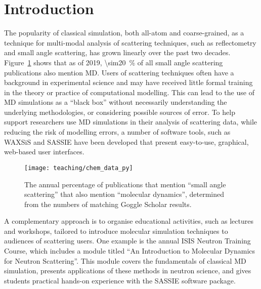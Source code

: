 \section{Introduction}
The popularity of classical simulation, both all-atom and coarse-grained, as a technique for multi-modal analysis of scattering techniques, such as reflectometry and small angle scattering, has grown linearly over the past two decades.\autocite{pan_molecular_2012,boldon_review_2015,hub_interpreting_2018,koutsioubas_combined_2016,darre_molecular_2015,scoppola_combining_2018}
Figure~\ref{fig:growth} shows that as of 2019, \SI{\sim20}{\percent} of all small angle scattering publications also mention MD.
Users of scattering techniques often have a background in experimental science and may have received little formal training in the theory or practice of computational modelling.
This can lead to the use of MD simulations as a ``black box'' without necessarily understanding the underlying methodologies, or considering possible sources of error.
To help support researchers use MD simulations in their analysis of scattering data, while reducing the risk of modelling errors, a number of software tools, such as WAXSiS\autocite{chen_validating_2014,knight_waxsis_2015} and SASSIE\autocite{perkins_atomistic_2016} have been developed that present easy-to-use, graphical, web-based user interfaces.
%
\begin{figure}
    \centering
    \texttt{[image: teaching/chem\_data\_py]}
    \caption{The annual percentage of publications that mention ``small angle scattering'' that also mention ``molecular dynamics'', determined from the numbers of matching Goggle Scholar results.}
    \label{fig:growth}
\end{figure}
%

A complementary approach is to organise educational activities, such as lectures and workshops, tailored to introduce molecular simulation techniques to audiences of scattering users.
One example is the annual ISIS Neutron Training Course, which includes a module titled ``An Introduction to Molecular Dynamics for Neutron Scattering''.
This module covers the fundamentals of classical MD simulation, presents applications of these methods in neutron science, and gives students practical hands-on experience with the SASSIE software package.\autocite{perkins_atomistic_2016}

